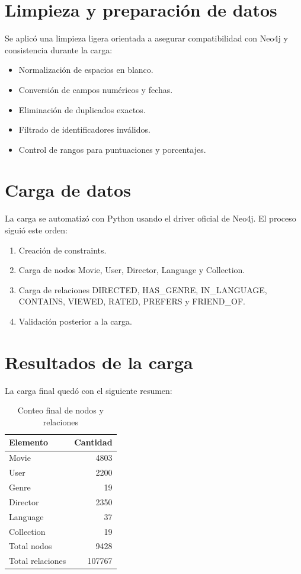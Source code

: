\documentclass[12pt,a4paper]{article}
\begin{document}
\section{Limpieza y preparación de datos}

Se aplicó una limpieza ligera orientada a asegurar compatibilidad con Neo4j y consistencia durante la carga:

\begin{itemize}
    \item Normalización de espacios en blanco.
    \item Conversión de campos numéricos y fechas.
    \item Eliminación de duplicados exactos.
    \item Filtrado de identificadores inválidos.
    \item Control de rangos para puntuaciones y porcentajes.
\end{itemize}

\section{Carga de datos}

La carga se automatizó con Python usando el driver oficial de Neo4j. El proceso siguió este orden:

\begin{enumerate}
    \item Creación de constraints.
    \item Carga de nodos Movie, User, Director, Language y Collection.
    \item Carga de relaciones DIRECTED, HAS\_GENRE, IN\_LANGUAGE, CONTAINS, VIEWED, RATED, PREFERS y FRIEND\_OF.
    \item Validación posterior a la carga.
\end{enumerate}

\section{Resultados de la carga}

La carga final quedó con el siguiente resumen:

\begin{table}[H]
\centering
\begin{tabular}{lr}
\toprule
\textbf{Elemento} & \textbf{Cantidad} \\
\midrule
Movie & 4803 \\
User & 2200 \\
Genre & 19 \\
Director & 2350 \\
Language & 37 \\
Collection & 19 \\
\midrule
Total nodos & 9428 \\
Total relaciones & 107767 \\
\bottomrule
\end{tabular}
\caption{Conteo final de nodos y relaciones}
\end{table}
\end{document}
